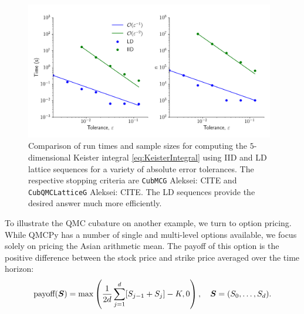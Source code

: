 \documentclass[graybox,footinfo]{svmult}
\newcommand{\AGSComment}[1]{{\color{cyan} Aleksei: #1}}
\begin{document}
\begin{figure}
	\includegraphics[height=6cm]{QMCSoftwareArticle/figs/sc_comp.png}
	\caption{Comparison of run times and sample sizes for computing the $5$-dimensional Keister integral \eqref{eq:KeisterIntegral} using IID and LD lattice sequences for a variety of absolute error tolerances.  The respective stopping criteria are  \texttt{CubMCG} \AGSComment{CITE} and  \texttt{CubQMCLatticeG} \AGSComment{CITE}. The LD sequences provide the desired answer much more efficiently.}
	\label{fig:sc_comp}
\end{figure}

To illustrate the QMC cubature on another example, we turn to option pricing. While QMCPy has a number of single and multi-level options available, we focus solely on pricing the Asian arithmetic mean. The payoff of this option is the positive difference between the stock price and strike price averaged over the time horizon: 
$$\text{payoff}({\boldsymbol{S}}) = \max\left(\frac{1}{2d}\sum_{j=1}^d [S_{j-1}+S_j]-K,0\right), \quad {\boldsymbol{S}} = (S_0, \ldots, S_d).$$
\end{document}
